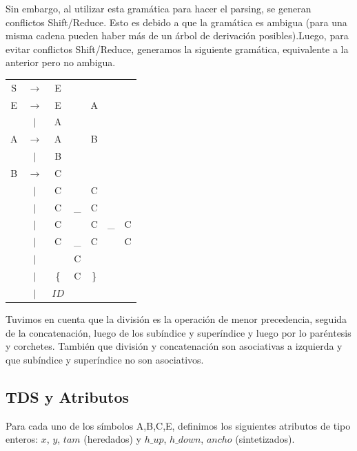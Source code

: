 \documentclass[a4paper, 10pt, twoside]{article}
\begin{document}
Sin embargo, al utilizar esta gramática para hacer el parsing, se generan conflictos Shift/Reduce. Esto es debido a que la gramática es ambigua (para una misma cadena pueden haber más de un árbol de derivación posibles).Luego, para evitar conflictos Shift/Reduce, generamos la siguiente gramática, equivalente a la anterior pero no ambigua.

\begin{table}[ht]
\begin{tabular} {c c c c c c c}

S & $\rightarrow$ & E &                   &   & & \\
E & $\rightarrow$ & E & \detokenize{/}    & A & & \\
  & $|$           & A &                   &   & & \\
A & $\rightarrow$ & A &                   & B & & \\
  & $|$           & B &                   &   & & \\
B & $\rightarrow$ & C &                   &   & & \\
  & $|$           & C & \detokenize{^}    & C & & \\
  & $|$           & C & \_                & C & & \\
  & $|$           & C & \detokenize{^}    & C & \_  & C \\
  & $|$           & C & \_                & C & \detokenize{^} & C \\
  & $|$           & \detokenize{(}        & C & \detokenize{)} & & \\
  & $|$           & \{                    & C & \} & & \\
  & $|$           & $ID$                  & & & & \\

\end{tabular}
\end{table}

Tuvimos en cuenta que la división es la operación de menor precedencia, seguida de la concatenación, luego de los subíndice y superíndice y luego por lo paréntesis y corchetes. También que división y concatenación son asociativas a izquierda y que subíndice y superíndice no son asociativos.

\subsection{TDS y Atributos}
Para cada uno de los símbolos A,B,C,E, definimos los siguientes atributos de tipo enteros: $x$, $y$, $tam$ (heredados) y $h\_up$, $h\_down$, $ancho$ (sintetizados). \\
\end{document}
